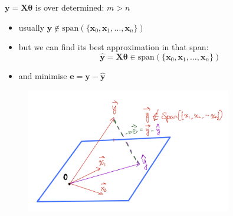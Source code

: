 \documentclass[ignorenonframetext,]{beamer}
\providecommand{\tightlist}{%
  \setlength{\itemsep}{0pt}\setlength{\parskip}{0pt}}
\newcommand{\vv}[1]{\boldsymbol{#1}}
\begin{document}
\begin{frame}{}
\protect\hypertarget{section-1}{}

\(\vv{y}= \vv{X\theta}\) is over determined: \(m>n\)

\begin{itemize}
\tightlist
\item
  usually
  \(\vv{y} \notin \text{span}(\{\vv{x}_0, \vv{x}_1, \ldots, \vv{x}_n\})\)
\item
  but we can find its best approximation in that span:
  \[\hat{\vv{y}} = \vv{X}\vv{\theta} \in \text{span}(\{\vv{x}_0, \vv{x}_1, \ldots, \vv{x}_n\})\]
\item
  and minimise \(\vv{e} = \vv{y}-\hat{\vv{y}}\)
\end{itemize}

\begin{figure}
    \centering
    \includegraphics[width = 0.8\textwidth]{./projview1.png}
\end{figure}

\end{frame}
\end{document}
